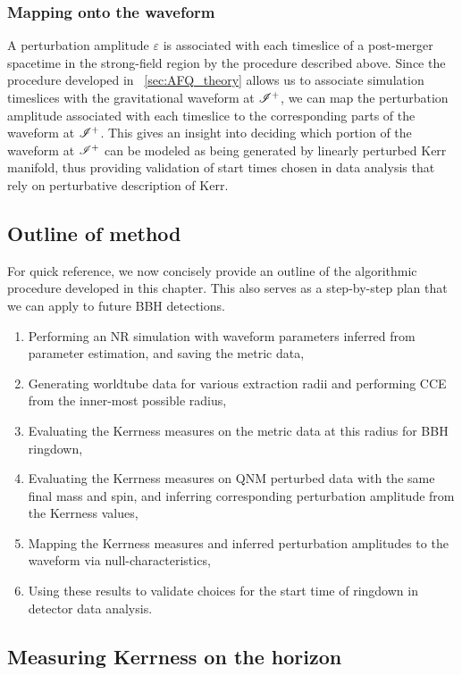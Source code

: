 \subsubsection{Mapping onto the waveform}
\label{AmpMapOnFni}
A perturbation amplitude $\varepsilon$ is associated with each timeslice of a post-merger spacetime in the strong-field region by the procedure described above. Since the procedure developed in ~\ref{sec:AFQ_theory} allows us to associate simulation timeslices with the gravitational waveform at $\mathscr{I^+}$, we can map the perturbation amplitude associated with each timeslice to the corresponding parts of the waveform at $\mathscr{I^+}$.  This gives an insight into deciding which portion of the waveform at $\mathscr{I^+}$ can be modeled as being generated by linearly perturbed Kerr manifold, thus providing validation of start times chosen in data analysis that rely on perturbative description of Kerr. 

\subsection{Outline of method}
\label{sec:MethodSummary}


For quick reference, we now concisely provide an outline of the algorithmic procedure developed in this chapter. This also serves as a step-by-step plan that we can apply to future BBH detections.

\begin{enumerate}
\item Performing an NR simulation with waveform parameters inferred from parameter estimation, and saving the metric data,
\item Generating worldtube data for various extraction radii and performing CCE from the inner-most possible radius,
\item Evaluating the Kerrness measures on the metric data at this radius for BBH ringdown, 
\item Evaluating the Kerrness measures on QNM perturbed data with the same final mass and spin, and inferring corresponding perturbation amplitude from the Kerrness values,
\item Mapping the Kerrness measures and inferred perturbation amplitudes to the waveform via null-characteristics,
\item Using these results to validate choices for the start time of ringdown in detector data analysis.
\end{enumerate}


\subsection{Measuring Kerrness on the horizon}
\label{sec:MultipolarTheory}

